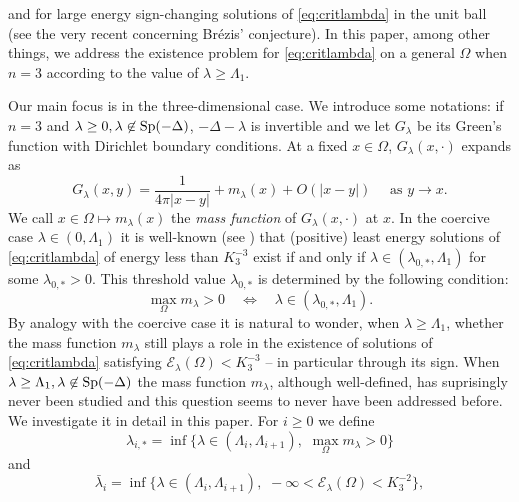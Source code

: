 \documentclass[10pt]{amsart}
\numberwithin{equation}{section}
\newcommand{\Sp}{{\rm Sp}}
\newcommand{\Om}{\Omega}
\theoremstyle{plain}
\theoremstyle{remark}
\begin{document}
\cite{FortunatoJannelli, SunWeiYang2} and for large energy sign-changing solutions of \eqref{eq:critlambda} in the unit ball (see the very recent \cite{SunWeiYang} concerning Br\'ezis' conjecture). In this paper, among other things, we address the existence problem for \eqref{eq:critlambda} on a general $\Om$ when $n=3$ according to the value of $\lambda \ge \Lambda_1$. 

\medskip

Our main focus is in the three-dimensional case. We introduce some notations: if $n=3$ and  $\lambda \ge 0, \lambda \not \in \Sp(-\Delta)$, $-\Delta - \lambda$ is invertible and we let $G_\lambda$ be its Green's function with Dirichlet boundary conditions. At a fixed $x \in \Om$, $G_\lambda(x,\cdot)$ expands as 
\begin{equation*} 
	G_\lambda(x,y)=\frac{1}{4 \pi |x-y|}+ m_\lambda(x) + O(|x-y|) \quad \text{ as } y \to x.
\end{equation*}
We call $x \in \Om \mapsto m_\lambda(x)$ the \emph{mass function} of $G_\lambda(x,\cdot)$ at $x$. In the coercive case $ \lambda \in (0, \Lambda_1)$ it is well-known (see \cite{BN, Druetdim3}) that (positive) least energy solutions of \eqref{eq:critlambda} of energy less than $K_3^{-3}$ exist if and only if $\lambda \in (\lambda_{0,*}, \Lambda_1)$ for some $\lambda_{0,*} >0$. This threshold value $\lambda_{0,*}$ is determined by the following condition:
\begin{equation} \label{deflambdastar}
\max_{\Om} m_{\lambda} >0 \quad \iff \quad  \lambda \in (\lambda_{0,*}, \Lambda_1).
\end{equation}
By analogy with the coercive case it is natural to wonder, when $\lambda \ge \Lambda_1$, whether the mass function $m_\lambda$ still plays a role in the existence of solutions of \eqref{eq:critlambda} satisfying $\mathcal{E}_\lambda(\Om) < K_3^{-3}$ -- in particular through its sign. When $\lambda \ge \Lambda_1, \lambda \not \in \Sp(-\Delta)$ the mass function $m_\lambda$, although well-defined, has suprisingly never been studied and this question seems to never have been addressed before. We investigate it in detail in this paper. For $i \ge 0$ we define 
 \begin{equation} \label{deflambdaistar}
 \lambda_{i,*} =  \inf \big \{ \lambda \in (\Lambda_i, \Lambda_{i+1}), \, \, \max_{\Om} m_\lambda >0  \big \} 
 \end{equation}
and
\begin{equation} \label{def:lambdai:min}
\bar{\lambda}_i = \inf \big \{ \lambda \in (\Lambda_i, \Lambda_{i+1}),\, \,   -\infty < \mathcal{E}_\lambda(\Om) < K_3^{-2} \big \},
\end{equation}
\end{document}

